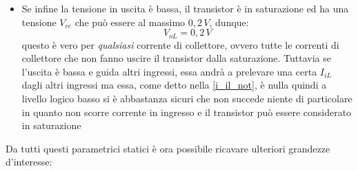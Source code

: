 \documentclass[12pt, a4paper]{report}
\begin{document}
\begin{itemize}
    \item Se infine la tensione in uscita è bassa, il transistor è in saturazione ed ha una tensione $V_{ce}$ che può essere al massimo $0,2\,V$, dunque:
    \begin{equation}
        V_{oL} = 0,2\,V
        \label{v_ol_not}
    \end{equation}
    questo è vero per \textit{qualsiasi} corrente di collettore, ovvero tutte le correnti di collettore che non fanno uscire il transistor dalla saturazione. Tuttavia se l'uscita è bassa e guida altri ingressi, essa andrà a prelevare una certa $I_{iL}$ dagli altri ingressi ma essa, come detto nella \eqref{i_il_not}, è nulla quindi a livello logico basso si è abbastanza sicuri che non succede niente di particolare in quanto non scorre corrente in ingresso e il transistor può essere considerato in saturazione
\end{itemize}
Da tutti questi parametrici statici è ora possibile ricavare ulteriori grandezze d'interesse:
\end{document}
